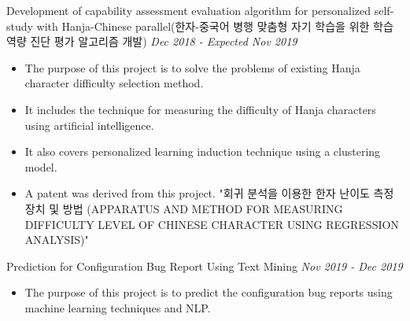 \documentclass[10pt]{article}
\newenvironment{changemargin}[2]{
  \begin{list}{}{
    \setlength{\topsep}{0pt}
    \setlength{\leftmargin}{#1}
    \setlength{\rightmargin}{#2}
    \setlength{\listparindent}{\parindent}
    \setlength{\itemindent}{\parindent}
    \setlength{\parsep}{\parskip}
  }
  \item[]}{\end{list}
}
\newcommand{\project}[2]{
	{#1} \hfill \emph{#2}\\ \medskip
}
\newenvironment{body} {
	\vspace*{-16pt}
	\begin{changemargin}{-0.25in}{-0.5in}
  }
	{\end{changemargin}
}
\begin{document}
\begin{body}
\project{Development of capability assessment evaluation algorithm for personalized self-study with Hanja-Chinese parallel(한자-중국어 병행 맞춤형 자기 학습을 위한 학습 역량 진단 평가 알고리즘 개발)}{Dec 2018 - Expected Nov 2019}
\begin{itemize} \itemsep -0pt  %
      \item  The purpose of this project is to solve the problems of existing Hanja character difficulty selection method.
      \item It includes the technique for measuring the difficulty of Hanja characters using artificial intelligence.
      \item It also covers personalized learning induction technique using a clustering model.
      \item A patent was derived from this project. "회귀 분석을 이용한 한자 난이도 측정 장치 및 방법
(APPARATUS AND METHOD FOR MEASURING DIFFICULTY LEVEL OF CHINESE CHARACTER USING REGRESSION ANALYSIS)"
  	\end{itemize}
	
\project{Prediction for Configuration Bug Report Using Text Mining}{Nov 2019 - Dec 2019}
\begin{itemize} \itemsep -0pt  %
      \item  The purpose of this project is to predict the configuration bug reports using machine learning techniques and NLP.
  	\end{itemize}
	
\end{body}


\medskip
\end{document}
